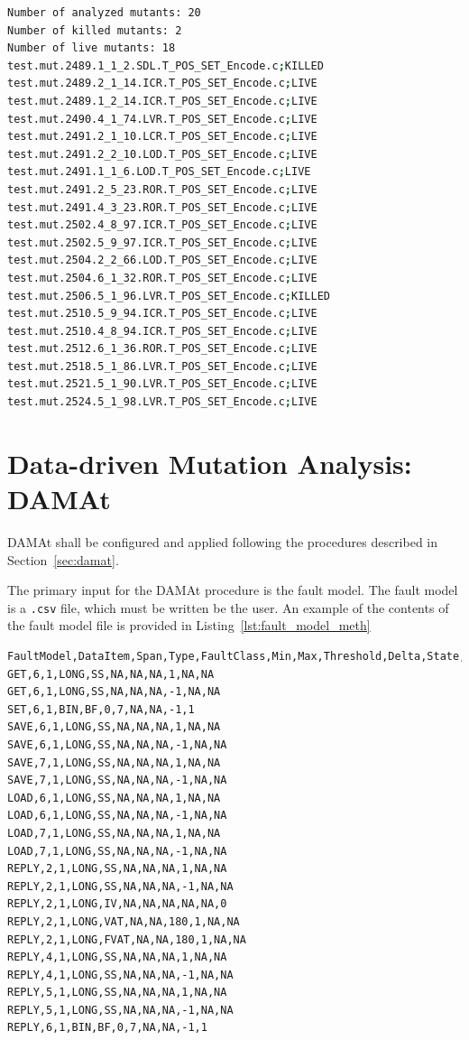 \begin{lstlisting}[language=bash, label=semus_output, caption=SEMuS output.]
Number of analyzed mutants: 20
Number of killed mutants: 2
Number of live mutants: 18
test.mut.2489.1_1_2.SDL.T_POS_SET_Encode.c;KILLED
test.mut.2489.2_1_14.ICR.T_POS_SET_Encode.c;LIVE
test.mut.2489.1_2_14.ICR.T_POS_SET_Encode.c;LIVE
test.mut.2490.4_1_74.LVR.T_POS_SET_Encode.c;LIVE
test.mut.2491.2_1_10.LCR.T_POS_SET_Encode.c;LIVE
test.mut.2491.2_2_10.LOD.T_POS_SET_Encode.c;LIVE
test.mut.2491.1_1_6.LOD.T_POS_SET_Encode.c;LIVE
test.mut.2491.2_5_23.ROR.T_POS_SET_Encode.c;LIVE
test.mut.2491.4_3_23.ROR.T_POS_SET_Encode.c;LIVE
test.mut.2502.4_8_97.ICR.T_POS_SET_Encode.c;LIVE
test.mut.2502.5_9_97.ICR.T_POS_SET_Encode.c;LIVE
test.mut.2504.2_2_66.LOD.T_POS_SET_Encode.c;LIVE
test.mut.2504.6_1_32.ROR.T_POS_SET_Encode.c;LIVE
test.mut.2506.5_1_96.LVR.T_POS_SET_Encode.c;KILLED
test.mut.2510.5_9_94.ICR.T_POS_SET_Encode.c;LIVE
test.mut.2510.4_8_94.ICR.T_POS_SET_Encode.c;LIVE
test.mut.2512.6_1_36.ROR.T_POS_SET_Encode.c;LIVE
test.mut.2518.5_1_86.LVR.T_POS_SET_Encode.c;LIVE
test.mut.2521.5_1_90.LVR.T_POS_SET_Encode.c;LIVE
test.mut.2524.5_1_98.LVR.T_POS_SET_Encode.c;LIVE
\end{lstlisting}
 \ENDCHANGEDFINAL


\clearpage
\section{Data-driven Mutation Analysis: DAMAt}
\label{sec:meth:damat}

DAMAt shall be configured and applied following the procedures described in Section~\ref{sec:damat}.

\STARTCHANGEDFINAL

The primary input for the DAMAt procedure is the fault model.
The fault model is a \texttt{.csv} file, which must be written be the user.
An example of the contents of the fault model file is provided in Listing~\ref{lst:fault_model_meth}

\begin{lstlisting}[caption={Example of a DAMAt fault model, represented in a \texttt{.csv} file. },label={lst:fault_model_meth}]
FaultModel,DataItem,Span,Type,FaultClass,Min,Max,Threshold,Delta,State,Value
GET,6,1,LONG,SS,NA,NA,NA,1,NA,NA
GET,6,1,LONG,SS,NA,NA,NA,-1,NA,NA
SET,6,1,BIN,BF,0,7,NA,NA,-1,1
SAVE,6,1,LONG,SS,NA,NA,NA,1,NA,NA
SAVE,6,1,LONG,SS,NA,NA,NA,-1,NA,NA
SAVE,7,1,LONG,SS,NA,NA,NA,1,NA,NA
SAVE,7,1,LONG,SS,NA,NA,NA,-1,NA,NA
LOAD,6,1,LONG,SS,NA,NA,NA,1,NA,NA
LOAD,6,1,LONG,SS,NA,NA,NA,-1,NA,NA
LOAD,7,1,LONG,SS,NA,NA,NA,1,NA,NA
LOAD,7,1,LONG,SS,NA,NA,NA,-1,NA,NA
REPLY,2,1,LONG,SS,NA,NA,NA,1,NA,NA
REPLY,2,1,LONG,SS,NA,NA,NA,-1,NA,NA
REPLY,2,1,LONG,IV,NA,NA,NA,NA,NA,0
REPLY,2,1,LONG,VAT,NA,NA,180,1,NA,NA
REPLY,2,1,LONG,FVAT,NA,NA,180,1,NA,NA
REPLY,4,1,LONG,SS,NA,NA,NA,1,NA,NA
REPLY,4,1,LONG,SS,NA,NA,NA,-1,NA,NA
REPLY,5,1,LONG,SS,NA,NA,NA,1,NA,NA
REPLY,5,1,LONG,SS,NA,NA,NA,-1,NA,NA
REPLY,6,1,BIN,BF,0,7,NA,NA,-1,1
\end{lstlisting}

